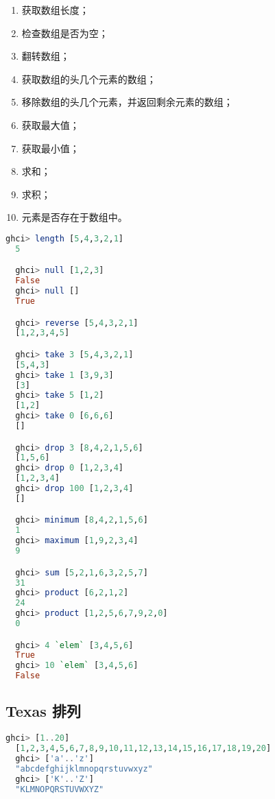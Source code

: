 \documentclass[./main.tex]{subfiles}
\begin{document}
\begin{enumerate}
  \item {} 获取数组长度；
  \item {} 检查数组是否为空；
  \item {} 翻转数组；
  \item {} 获取数组的头几个元素的数组；
  \item {} 移除数组的头几个元素，并返回剩余元素的数组；
  \item {} 获取最大值；
  \item {} 获取最小值；
  \item {} 求和；
  \item {} 求积；
  \item {} 元素是否存在于数组中。
\end{enumerate}

\begin{lstlisting}[language=Haskell]
  ghci> length [5,4,3,2,1]
  5

  ghci> null [1,2,3]
  False
  ghci> null []
  True

  ghci> reverse [5,4,3,2,1]
  [1,2,3,4,5]

  ghci> take 3 [5,4,3,2,1]
  [5,4,3]
  ghci> take 1 [3,9,3]
  [3]
  ghci> take 5 [1,2]
  [1,2]
  ghci> take 0 [6,6,6]
  []

  ghci> drop 3 [8,4,2,1,5,6]
  [1,5,6]
  ghci> drop 0 [1,2,3,4]
  [1,2,3,4]
  ghci> drop 100 [1,2,3,4]
  []

  ghci> minimum [8,4,2,1,5,6]
  1
  ghci> maximum [1,9,2,3,4]
  9

  ghci> sum [5,2,1,6,3,2,5,7]
  31
  ghci> product [6,2,1,2]
  24
  ghci> product [1,2,5,6,7,9,2,0]
  0

  ghci> 4 `elem` [3,4,5,6]
  True
  ghci> 10 `elem` [3,4,5,6]
  False
\end{lstlisting}

\subsection*{Texas 排列}

\begin{lstlisting}[language=Haskell]
  ghci> [1..20]
  [1,2,3,4,5,6,7,8,9,10,11,12,13,14,15,16,17,18,19,20]
  ghci> ['a'..'z']
  "abcdefghijklmnopqrstuvwxyz"
  ghci> ['K'..'Z']
  "KLMNOPQRSTUVWXYZ"
\end{lstlisting}
\end{document}

